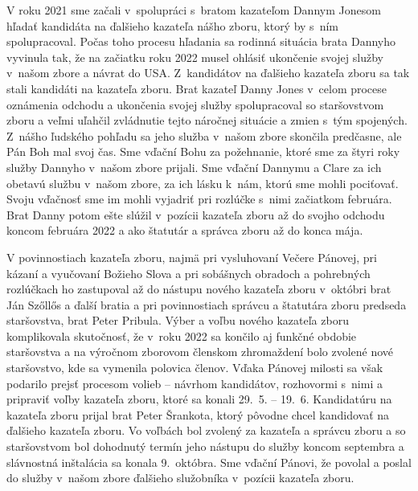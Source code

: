V roku 2021 sme začali v~spolupráci s~bratom kazateľom Dannym Jonesom hľadať kandidáta na ďalšieho kazateľa nášho zboru, ktorý by s~ním spolupracoval. Počas toho procesu hľadania sa rodinná situácia brata Dannyho vyvinula tak, že na začiatku roku 2022 musel ohlásiť ukončenie svojej služby v~našom zbore a návrat do USA. Z~kandidátov na ďalšieho kazateľa zboru sa tak stali kandidáti na kazateľa zboru. Brat kazateľ Danny Jones v~celom procese oznámenia odchodu a ukončenia svojej služby spolupracoval so staršovstvom zboru a veľmi uľahčil zvládnutie tejto náročnej situácie a zmien s~tým spojených. Z~nášho ľudského pohľadu sa jeho služba v~našom zbore skončila predčasne, ale Pán Boh mal svoj čas. Sme vďační Bohu za požehnanie, ktoré sme za štyri roky služby Dannyho v~našom zbore prijali. Sme vďační Dannymu a Clare za ich obetavú službu v~našom zbore, za ich lásku k~nám, ktorú sme mohli pociťovať. Svoju vďačnosť sme im mohli vyjadriť pri rozlúčke s~nimi začiatkom februára. Brat Danny potom ešte slúžil v~pozícii kazateľa zboru až do svojho odchodu koncom februára 2022 a ako štatutár a správca zboru až do konca mája.

V povinnostiach kazateľa zboru, najmä pri vysluhovaní Večere Pánovej, pri kázaní a vyučovaní Božieho Slova a pri sobášnych obradoch a pohrebných rozlúčkach ho zastupoval až do nástupu nového kazateľa zboru v~októbri brat Ján Szőllős a ďalší bratia a pri povinnostiach správcu a štatutára zboru predseda staršovstva, brat Peter Pribula.
Výber a voľbu nového kazateľa zboru komplikovala skutočnosť, že v~roku 2022 sa končilo aj funkčné obdobie staršovstva a na výročnom zborovom členskom zhromaždení bolo zvolené nové staršovstvo, kde sa vymenila polovica členov. Vďaka Pánovej milosti sa však podarilo prejsť procesom volieb -- návrhom kandidátov, rozhovormi s~nimi a pripraviť voľby kazateľa zboru, ktoré sa konali 29.~5. -- 19.~6. Kandidatúru na kazateľa zboru prijal brat Peter Šrankota, ktorý pôvodne chcel kandidovať na ďalšieho kazateľa zboru. Vo voľbách bol zvolený za kazateľa a správcu zboru a so staršovstvom bol dohodnutý termín jeho nástupu do služby koncom septembra a slávnostná inštalácia sa konala 9.~októbra. Sme vďační Pánovi, že povolal a poslal do služby v~našom zbore ďalšieho služobníka v~pozícii kazateľa zboru.

